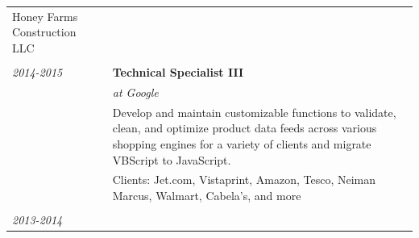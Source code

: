 \documentclass[]{article}
\begin{document}
\begin{multicols}{2}
\begin{longtable}[c]{@{}ll@{}}
\begin{minipage}[t]{0.74\columnwidth}
Honey Farms Construction LLC
\strut\end{minipage}\tabularnewline
\begin{minipage}[t]{0.20\columnwidth}\raggedright\strut
\strut\end{minipage} &
\begin{minipage}[t]{0.74\columnwidth}\raggedright\strut
\strut\end{minipage}\tabularnewline
\begin{minipage}[t]{0.20\columnwidth}\raggedright\strut
\color{grey} \emph{2014-2015}
\strut\end{minipage} &
\begin{minipage}[t]{0.74\columnwidth}\raggedright\strut
\textbf{Technical Specialist III}
\strut\end{minipage}\tabularnewline
\begin{minipage}[t]{0.20\columnwidth}\raggedright\strut
\strut\end{minipage} &
\begin{minipage}[t]{0.74\columnwidth}\raggedright\strut
\emph{at Google}
\strut\end{minipage}\tabularnewline
\begin{minipage}[t]{0.20\columnwidth}\raggedright\strut
\strut\end{minipage} &
\begin{minipage}[t]{0.74\columnwidth}\raggedright\strut
\color{grey} Develop and maintain customizable functions to validate,
clean, and optimize product data feeds across various shopping engines
for a variety of clients and migrate VBScript to JavaScript.
\strut\end{minipage}\tabularnewline
\begin{minipage}[t]{0.20\columnwidth}\raggedright\strut
\strut\end{minipage} &
\begin{minipage}[t]{0.74\columnwidth}\raggedright\strut
Clients: Jet.com, Vistaprint, Amazon, Tesco, Neiman Marcus, Walmart,
Cabela's, and more
\strut\end{minipage}\tabularnewline
\begin{minipage}[t]{0.20\columnwidth}\raggedright\strut
\strut\end{minipage} &
\begin{minipage}[t]{0.74\columnwidth}\raggedright\strut
\strut\end{minipage}\tabularnewline
\begin{minipage}[t]{0.20\columnwidth}\raggedright\strut
\color{grey} \emph{2013-2014}
\strut\end{minipage} &

\end{longtable}
\end{multicols}
\end{document}
